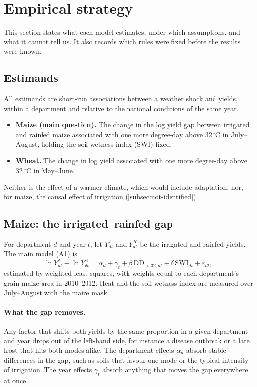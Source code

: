 \section{Empirical strategy}
\label{sec:strategy}

This section states what each model estimates, under which assumptions, and what it cannot tell us. It also records which rules were fixed before the results were known.

\subsection{Estimands}

All estimands are short-run associations between a weather shock and yields, within a department and relative to the national conditions of the same year.
\begin{itemize}
  \item \textbf{Maize (main question).} The change in the log yield gap between irrigated and rainfed maize associated with one more degree-day above 32\,$^{\circ}$C in July--August, holding the soil wetness index (SWI) fixed.
  \item \textbf{Wheat.} The change in log yield associated with one more degree-day above 32\,$^{\circ}$C in May--June.
\end{itemize}
Neither is the effect of a warmer climate, which would include adaptation, nor, for maize, the causal effect of irrigation (\cref{subsec:not-identified}).

\subsection{Maize: the irrigated--rainfed gap}

For department $d$ and year $t$, let $Y^{I}_{dt}$ and $Y^{R}_{dt}$ be the irrigated and rainfed yields. The main model (A1) is
\begin{equation}
\label{eq:a1}
\ln Y^{I}_{dt} - \ln Y^{R}_{dt} = \alpha_d + \gamma_t + \beta\, \mathrm{DD}_{>32,dt} + \delta\, \mathrm{SWI}_{dt} + \varepsilon_{dt},
\end{equation}
estimated by weighted least squares, with weights equal to each department's grain maize area in 2010--2012. Heat and the soil wetness index are measured over July--August with the maize mask.

\paragraph{What the gap removes.} Any factor that shifts both yields by the same proportion in a given department and year drops out of the left-hand side, for instance a disease outbreak or a late frost that hits both modes alike. The department effects $\alpha_d$ absorb stable differences in the gap, such as soils that favour one mode or the typical intensity of irrigation. The year effects $\gamma_t$ absorb anything that moves the gap everywhere at once.

